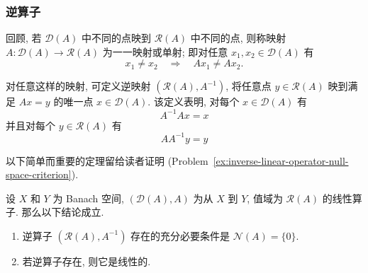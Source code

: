 \subsubsection{逆算子}\label{subsec:inverse-operators}

回顾, 若 $\mathcal{D}(A)$ 中不同的点映到 $\mathcal{R}(A)$ 中不同的点, 则称映射 $A:\mathcal{D}(A)\to\mathcal{R}(A)$ 为一一映射或单射; 即对任意 $x_1,x_2\in\mathcal{D}(A)$ 有
\begin{equation}\label{eq:linear-operator-injectivity-condition}
x_1\ne x_2\quad\Rightarrow\quad Ax_1\ne Ax_2.
\end{equation}


对任意这样的映射, 可定义逆映射 $(\mathcal{R}(A),A^{-1})$, 将任意点 $y\in\mathcal{R}(A)$ 映到满足 $Ax=y$ 的唯一点 $x\in\mathcal{D}(A)$. 该定义表明, 对每个 $x\in\mathcal{D}(A)$ 有
\begin{equation}\label{eq:inverse-operator-left-identity}
A^{-1}Ax=x
\end{equation}
并且对每个 $y\in\mathcal{R}(A)$ 有
\begin{equation}\label{eq:inverse-operator-right-identity}
AA^{-1}y=y
\end{equation}


以下简单而重要的定理留给读者证明 (Problem~\ref{ex:inverse-linear-operator-null-space-criterion}).

\begin{Theorem}
\label{thm:inverse-linear-operator-null-space}
设 $X$ 和 $Y$ 为 Banach 空间, $(\mathcal{D}(A),A)$ 为从 $X$ 到 $Y$, 值域为 $\mathcal{R}(A)$ 的线性算子. 那么以下结论成立.\begin{enumerate}
\item 逆算子 $(\mathcal{R}(A),A^{-1})$ 存在的充分必要条件是 $\mathcal{N}(A)=\{0\}$.
\item 若逆算子存在, 则它是线性的.
\end{enumerate}
\end{Theorem}
